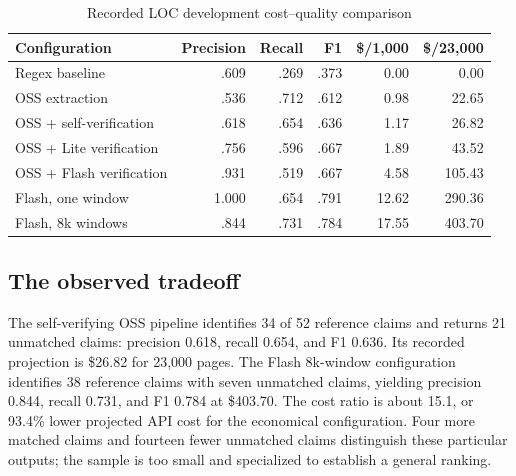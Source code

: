 \begin{table}[t]
\caption{Recorded LOC development cost--quality comparison}\label{tab:cost}
\centering\small
\begin{tabularx}{\linewidth}{Xrrrrr}
\toprule
Configuration & Precision & Recall & F1 & \$/1,000 & \$/23,000\\
\midrule
Regex baseline & .609 & .269 & .373 & 0.00 & 0.00\\
OSS extraction & .536 & .712 & .612 & 0.98 & 22.65\\
OSS + self-verification & .618 & .654 & .636 & 1.17 & 26.82\\
OSS + Lite verification & .756 & .596 & .667 & 1.89 & 43.52\\
OSS + Flash verification & .931 & .519 & .667 & 4.58 & 105.43\\
Flash, one window & 1.000 & .654 & .791 & 12.62 & 290.36\\
Flash, 8k windows & .844 & .731 & .784 & 17.55 & 403.70\\
\bottomrule
\end{tabularx}
\end{table}

\subsection{The observed tradeoff}
The self-verifying OSS pipeline identifies 34 of 52 reference claims and returns 21 unmatched claims: precision 0.618, recall 0.654, and F1 0.636. Its recorded projection is \$26.82 for 23,000 pages. The Flash 8k-window configuration identifies 38 reference claims with seven unmatched claims, yielding precision 0.844, recall 0.731, and F1 0.784 at \$403.70. The cost ratio is about 15.1, or 93.4\% lower projected API cost for the economical configuration. Four more matched claims and fourteen fewer unmatched claims distinguish these particular outputs; the sample is too small and specialized to establish a general ranking.

